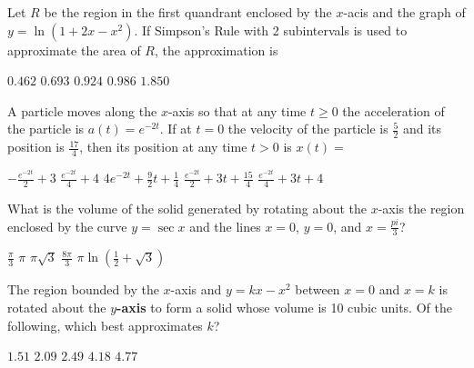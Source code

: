 \begin{questions}
\question[2] Let $R$ be the region in the first quandrant enclosed by
    the $x$-acis and the graph of $y = \ln(1 + 2x - x^2)$. If
    Simpson's Rule with 2 subintervals is used to approximate the area
    of $R$, the approximation is

    \begin{oneparchoices}
    \choice $0.462$
    \choice $0.693$
    \CorrectChoice $0.924$
    \choice $0.986$
    \choice $1.850$
    \end{oneparchoices}

\question[2] A particle moves along the $x$-axis so that at any time
    $t \ge 0$ the acceleration of the particle is $a(t) = e^{-2t}$. If
    at $t = 0$ the velocity of the particle is $\frac{5}{2}$ and its
    position is $\frac{17}{4}$, then its position at any time $t > 0$
    is $x(t) = $

    \begin{oneparchoices}
    \choice $-\frac{e^{-2t}}{2} + 3$
    \choice $\frac{e^{-2t}}{4} + 4$
    \choice $4e^{-2t} + \frac{9}{2}t + \frac{1}{4}$
    \choice $\frac{e^{-2t}}{2} + 3t + \frac{15}{4}$
    \CorrectChoice $\frac{e^{-2t}}{4} + 3t + 4$
    \end{oneparchoices}

\question[2] What is the volume of the solid generated by rotating
    about the $x$-axis the region enclosed by the curve $y = \sec x$
    and the lines $x = 0$, $y = 0$, and $x = \frac{pi}{3}$?

    \begin{oneparchoices}
    \choice $\frac{\pi}{3}$
    \choice $\pi$
    \CorrectChoice $\pi\sqrt{3}$
    \choice $\frac{8\pi}{3}$
    \choice $\pi\ln(\frac{1}{2} + \sqrt{3})$
    \end{oneparchoices}

\question[2] The region bounded by the $x$-axis and $y = kx - x^2$
    between $x = 0$ and $x = k$ is rotated about the {\bf $y$-axis} to
    form a solid whose volume is 10 cubic units. Of the following,
    which best approximates $k$?

    \begin{oneparchoices}
    \choice $1.51$
    \CorrectChoice $2.09$
    \choice $2.49$
    \choice $4.18$
    \choice $4.77$
    \end{oneparchoices}


\end{questions}
